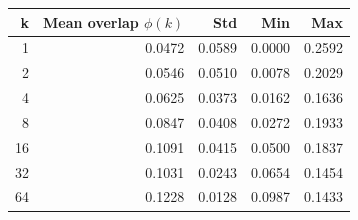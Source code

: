 \begin{tabular}{rrrrr}
\toprule
k & Mean overlap $\phi(k)$ & Std & Min & Max \\
\midrule
1 & 0.0472 & 0.0589 & 0.0000 & 0.2592 \\
2 & 0.0546 & 0.0510 & 0.0078 & 0.2029 \\
4 & 0.0625 & 0.0373 & 0.0162 & 0.1636 \\
8 & 0.0847 & 0.0408 & 0.0272 & 0.1933 \\
16 & 0.1091 & 0.0415 & 0.0500 & 0.1837 \\
32 & 0.1031 & 0.0243 & 0.0654 & 0.1454 \\
64 & 0.1228 & 0.0128 & 0.0987 & 0.1433 \\
\bottomrule
\end{tabular}
